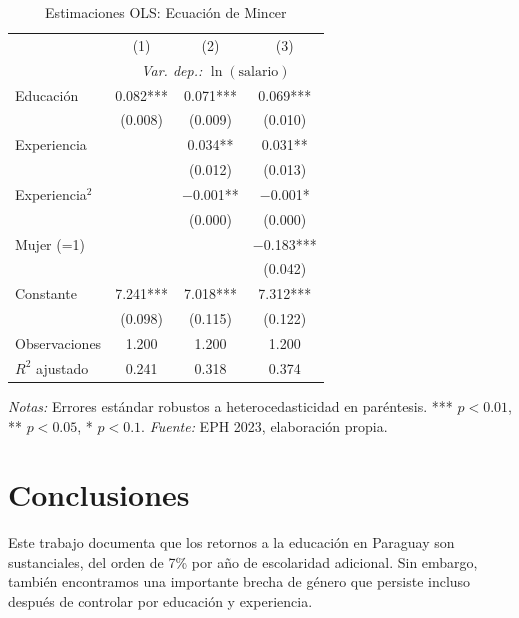 \documentclass[12pt, a4paper]{article}
\begin{document}
\begin{table}[htbp]
  \centering
  \caption{Estimaciones OLS: Ecuación de Mincer}
  \label{tab:reg}
  \begin{tabular}{lccc}
    \toprule
                    & (1)        & (2)        & (3)        \\
                    & \multicolumn{3}{c}{\textit{Var. dep.: } $\ln(\text{salario})$} \\
    \midrule
    Educación       & 0.082***   & 0.071***   & 0.069***   \\
                    & (0.008)    & (0.009)    & (0.010)    \\[4pt]
    Experiencia     &            & 0.034**    & 0.031**    \\
                    &            & (0.012)    & (0.013)    \\[4pt]
    Experiencia$^2$ &            & $-$0.001** & $-$0.001*  \\
                    &            & (0.000)    & (0.000)    \\[4pt]
    Mujer (=1)      &            &            & $-$0.183***\\
                    &            &            & (0.042)    \\[4pt]
    Constante       & 7.241***   & 7.018***   & 7.312***   \\
                    & (0.098)    & (0.115)    & (0.122)    \\
    \midrule
    Observaciones   & 1.200      & 1.200      & 1.200      \\
    $R^2$ ajustado  & 0.241      & 0.318      & 0.374      \\
    \bottomrule
  \end{tabular}
  \begin{minipage}{\linewidth}
    \footnotesize \textit{Notas:} Errores estándar robustos a 
    heterocedasticidad en paréntesis. *** $p<0.01$, ** $p<0.05$, 
    * $p<0.1$. \textit{Fuente:} EPH 2023, elaboración propia.
  \end{minipage}
\end{table}

\section{Conclusiones}

Este trabajo documenta que los retornos a la educación en Paraguay son 
sustanciales, del orden de 7\% por año de escolaridad adicional. Sin embargo, 
también encontramos una importante brecha de género que persiste incluso después 
de controlar por educación y experiencia.
\end{document}
